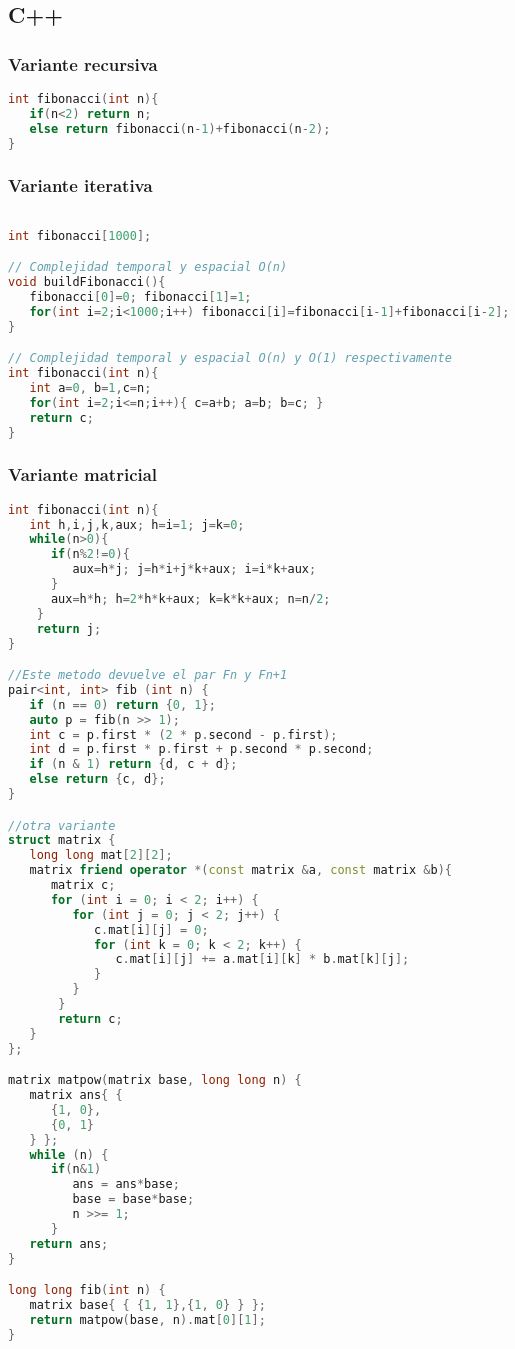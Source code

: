 \subsection{C++}

\subsubsection{Variante recursiva}

\begin{lstlisting}[language=C++]
int fibonacci(int n){
   if(n<2) return n;
   else return fibonacci(n-1)+fibonacci(n-2);	
}
\end{lstlisting}

\subsubsection{Variante iterativa}

\begin{lstlisting}[language=C++]
	
int fibonacci[1000];

// Complejidad temporal y espacial O(n)
void buildFibonacci(){ 
   fibonacci[0]=0; fibonacci[1]=1;
   for(int i=2;i<1000;i++) fibonacci[i]=fibonacci[i-1]+fibonacci[i-2];	
}

// Complejidad temporal y espacial O(n) y O(1) respectivamente
int fibonacci(int n){ 
   int a=0, b=1,c=n;
   for(int i=2;i<=n;i++){ c=a+b; a=b; b=c; }
   return c;
}
\end{lstlisting}

\subsubsection{Variante matricial}

\begin{lstlisting}[language=C++]
int fibonacci(int n){
   int h,i,j,k,aux; h=i=1; j=k=0;
   while(n>0){
      if(n%2!=0){
         aux=h*j; j=h*i+j*k+aux; i=i*k+aux; 
      }
      aux=h*h; h=2*h*k+aux; k=k*k+aux; n=n/2;
    }
    return j;
}

//Este metodo devuelve el par Fn y Fn+1
pair<int, int> fib (int n) {
   if (n == 0) return {0, 1};
   auto p = fib(n >> 1);
   int c = p.first * (2 * p.second - p.first);
   int d = p.first * p.first + p.second * p.second;
   if (n & 1) return {d, c + d};
   else return {c, d};
}

//otra variante
struct matrix {
   long long mat[2][2];
   matrix friend operator *(const matrix &a, const matrix &b){
      matrix c;
      for (int i = 0; i < 2; i++) {
         for (int j = 0; j < 2; j++) {
            c.mat[i][j] = 0;
            for (int k = 0; k < 2; k++) {
               c.mat[i][j] += a.mat[i][k] * b.mat[k][j];
            }
         }
       }
       return c;
   }
};

matrix matpow(matrix base, long long n) {
   matrix ans{ {
      {1, 0},
      {0, 1}
   } };
   while (n) {
      if(n&1)
         ans = ans*base;
         base = base*base;
         n >>= 1;
      }
   return ans;
}

long long fib(int n) {
   matrix base{ { {1, 1},{1, 0} } };
   return matpow(base, n).mat[0][1];
}
\end{lstlisting}

